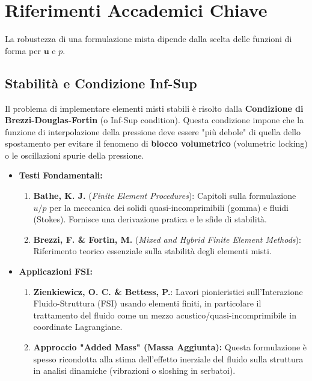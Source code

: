 \documentclass{article}
\begin{document}
\section{Riferimenti Accademici Chiave}

La robustezza di una formulazione mista dipende dalla scelta delle funzioni di forma per $\mathbf{u}$ e $p$.

\subsection{Stabilità e Condizione Inf-Sup}

Il problema di implementare elementi misti stabili è risolto dalla \textbf{Condizione di Brezzi-Douglas-Fortin} (o Inf-Sup condition). Questa condizione impone che la funzione di interpolazione della pressione deve essere "più debole" di quella dello spostamento per evitare il fenomeno di \textbf{blocco volumetrico} (volumetric locking) o le oscillazioni spurie della pressione.

\begin{itemize}
    \item \textbf{Testi Fondamentali:}
    \begin{enumerate}
        \item \textbf{Bathe, K. J.} (\emph{Finite Element Procedures}): Capitoli sulla formulazione $u/p$ per la meccanica dei solidi quasi-incomprimibili (gomma) e fluidi (Stokes). Fornisce una derivazione pratica e le sfide di stabilità.
        \item \textbf{Brezzi, F. \& Fortin, M.} (\emph{Mixed and Hybrid Finite Element Methods}): Riferimento teorico essenziale sulla stabilità degli elementi misti.
    \end{enumerate}
    \item \textbf{Applicazioni FSI:}
    \begin{enumerate}
        \item \textbf{Zienkiewicz, O. C. \& Bettess, P.}: Lavori pionieristici sull'Interazione Fluido-Struttura (FSI) usando elementi finiti, in particolare il trattamento del fluido come un mezzo acustico/quasi-incomprimibile in coordinate Lagrangiane.
        \item \textbf{Approccio "Added Mass" (Massa Aggiunta):} Questa formulazione è spesso ricondotta alla stima dell'effetto inerziale del fluido sulla struttura in analisi dinamiche (vibrazioni o sloshing in serbatoi).
    \end{enumerate}
\end{itemize}
\end{document}
